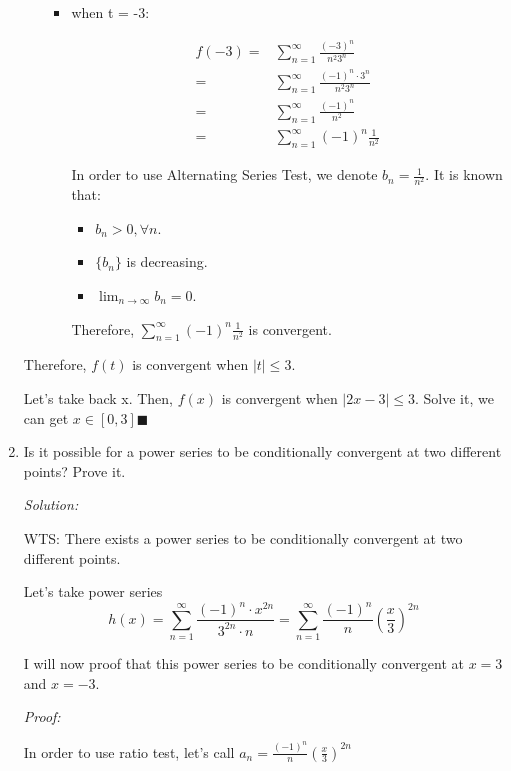 \documentclass[12pt]{exam}
\begin{document}
\begin{enumerate}
\begin{itemize}
\begin{itemize}
		\item when t = -3:

		\begin{align*}
			f(-3) 
			=& \sum_{n = 1}^{\infty} \frac{(-3)^n}{n^2 3^n} \\
			=& \sum_{n = 1}^{\infty} \frac{(-1)^n\cdot3^n}{n^2 3^n} \\
			=& \sum_{n = 1}^{\infty} \frac{(-1)^n}{n^2} \\
			=& \sum_{n = 1}^{\infty} (-1)^n \frac{1}{n^2}
		\end{align*}

		In order to use Alternating Series Test, we denote $b_n = \frac{1}{n^2}$. It is known that:
		\begin{itemize}
			\item $b_n > 0, \forall n$.
			\item $\{b_n\}$ is decreasing.
			\item $\lim_{n \to \infty} b_n = 0$.
		\end{itemize}

		Therefore, $\sum_{n = 1}^{\infty} (-1)^n \frac{1}{n^2}$ is convergent.
	\end{itemize}
\end{itemize}

Therefore, $f(t)$ is convergent when $|t| \leq 3$.

Let's take back x. Then, $f(x)$ is convergent when $|2x - 3| \leq 3$. Solve it, we can get $x \in [0, 3] \blacksquare$

\newpage

\item Is it possible for a power series to be conditionally convergent at two different points?  Prove it.

\emph{Solution:}

WTS: There exists a power series to be conditionally convergent at two different points.

Let's take power series $$h(x) = \sum_{n = 1}^{\infty} \frac{(-1)^n\cdot x^{2n}}{3^{2n}\cdot n}= \sum_{n = 1}^{\infty} \frac{(-1)^n}{n}(\frac{x}{3})^{2n}$$

I will now proof that this power series to be conditionally convergent at $x=3$ and $x=-3$.

\emph{Proof:}

In order to use ratio test, let's call $a_n =  \frac{(-1)^n}{n}(\frac{x}{3})^{2n}$


\end{enumerate}
\end{document}
